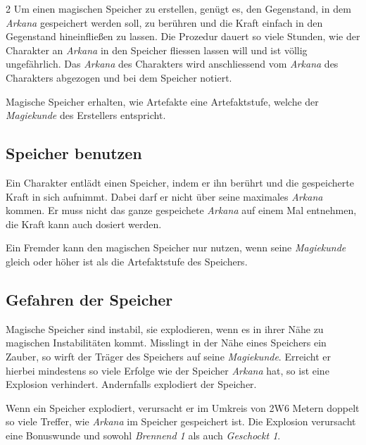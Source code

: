 \begin{multicols}{2}
Um einen magischen Speicher zu erstellen, genügt es, den Gegenstand, in dem \textit{Arkana} gespeichert werden soll, zu berühren und die Kraft einfach in den Gegenstand hineinfließen zu lassen. Die Prozedur dauert so viele Stunden, wie der Charakter an \textit{Arkana} in den Speicher fliessen lassen will und ist völlig ungefährlich. Das \textit{Arkana} des Charakters wird anschliessend vom \textit{Arkana} des Charakters abgezogen und bei dem Speicher notiert.

Magische Speicher erhalten, wie Artefakte eine Artefaktstufe, welche der \textit{Magiekunde} des Erstellers entspricht.

\subsection{Speicher benutzen}

Ein Charakter entlädt einen Speicher, indem er ihn berührt und die gespeicherte Kraft in sich aufnimmt. Dabei darf er nicht über seine maximales \textit{Arkana} kommen. Er muss nicht das ganze gespeichete \textit{Arkana} auf einem Mal entnehmen, die Kraft kann auch dosiert werden.

Ein Fremder kann den magischen Speicher nur nutzen, wenn seine \textit{Magiekunde} gleich oder höher ist als die Artefaktstufe des Speichers.

\subsection{Gefahren der Speicher}

Magische Speicher sind instabil, sie explodieren, wenn es in ihrer Nähe zu magischen Instabilitäten kommt. Misslingt in der Nähe eines Speichers ein Zauber, so wirft der Träger des Speichers auf seine \textit{Magiekunde}. Erreicht er hierbei mindestens so viele Erfolge wie der Speicher \textit{Arkana} hat, so ist eine Explosion verhindert. Andernfalls explodiert der Speicher.

Wenn ein Speicher explodiert, verursacht er im Umkreis von 2W6 Metern doppelt so viele Treffer, wie \textit{Arkana} im Speicher gespeichert ist. Die Explosion verursacht eine Bonuswunde und sowohl \textit{Brennend 1} als auch \textit{Geschockt 1}.

\end{multicols}
